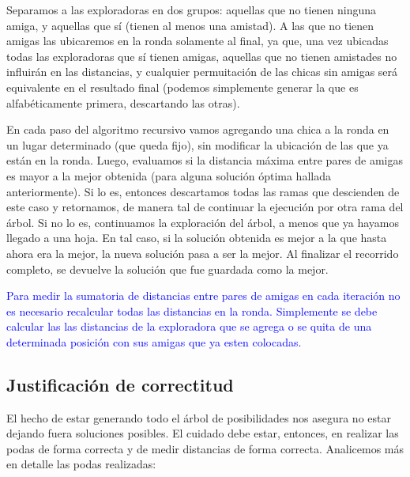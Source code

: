 Separamos a las exploradoras en dos grupos: aquellas que no tienen ninguna amiga, y aquellas que sí (tienen al menos una amistad). A las que no tienen amigas las ubicaremos en la ronda solamente al final, ya que, una vez ubicadas todas las exploradoras que sí tienen amigas, aquellas que no tienen amistades no influirán en las distancias, y cualquier permuitación de las chicas sin amigas será equivalente en el resultado final (podemos simplemente generar la que es alfabéticamente primera, descartando las otras).

En cada paso del algoritmo recursivo vamos agregando una chica a la ronda en un lugar determinado (que queda fijo), sin modificar la ubicación de las que ya están en la ronda. Luego, evaluamos si la distancia máxima entre pares de amigas es mayor a la mejor obtenida (para alguna solución óptima hallada anteriormente). Si lo es, entonces descartamos todas las ramas que descienden de este caso y retornamos, de manera tal de continuar la ejecución por otra rama del árbol. Si no lo es, continuamos la exploración del árbol, a menos que ya hayamos llegado a una hoja. En tal caso, si la solución obtenida es mejor a la que hasta ahora era la mejor, la nueva solución pasa a ser la mejor. Al finalizar el recorrido completo, se devuelve la solución que fue guardada como la mejor.

{\large \textcolor{blue}{Para medir la sumatoria de distancias entre pares de amigas en cada iteración no es necesario recalcular todas las distancias en la ronda. Simplemente se debe calcular las las distancias de la exploradora que se agrega o se quita de una determinada posición con sus amigas que ya esten colocadas.}}



\subsection{Justificación de correctitud}

El hecho de estar generando todo el árbol de posibilidades nos asegura no estar dejando fuera soluciones posibles. El cuidado debe estar, entonces, en realizar las podas de forma correcta y de medir distancias de forma correcta. Analicemos más en detalle las podas realizadas:


